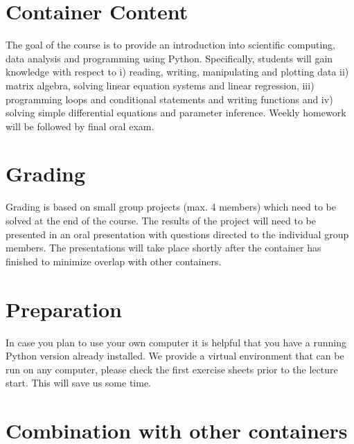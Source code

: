 \documentclass[letterpaper]{inzane_syllabus} %
\begin{document}
\vspace{0.5cm} %
\section{Container Content}


The goal of the course is to provide an introduction into scientific computing, data analysis and programming using Python. Specifically, students will gain knowledge with respect to i) reading, writing, manipulating and plotting data ii) matrix algebra, solving linear equation systems and linear regression, iii) programming loops and conditional statements and writing functions and iv) solving simple differential equations and parameter inference. Weekly homework will be followed by final oral exam. 

\section{Grading}

Grading is based on small group projects (max. 4 members) which need to be solved at the end of the course. The results of the project will need to be presented in an oral presentation with questions directed to the individual group members. The presentations will take place shortly after the container has finished to minimize overlap with other containers.  

\section{Preparation}

In case you plan to use your own computer it is helpful that you have a running Python version already installed. We provide a virtual environment that can be run on any computer, please check the first exercise sheets prior to the lecture start. This will save us some time.

\newpage %

\makeSide %

\section{Combination with other containers}
\end{document}
